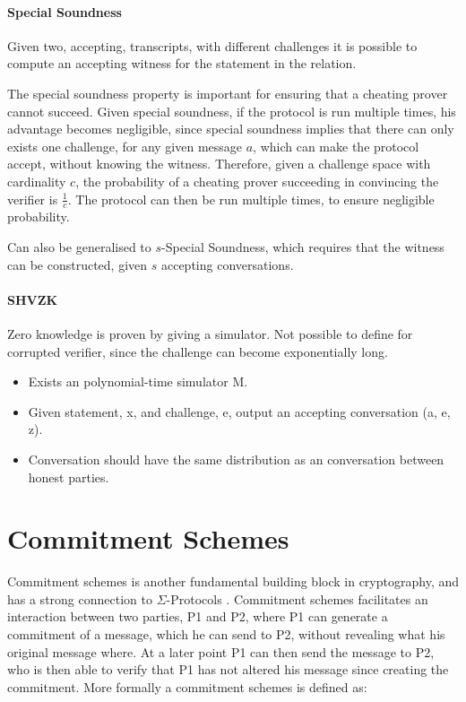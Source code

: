 \paragraph{Special Soundness}
Given two, accepting, transcripts, with different challenges it is possible to
compute an accepting witness for the statement in the relation.

The special soundness property is important for ensuring that a cheating prover
cannot succeed. Given special soundness, if the protocol is run multiple times,
his advantage becomes negligible, since special soundness implies that there can
only exists one challenge, for any given message $a$, which can make the
protocol accept, without knowing the witness. Therefore, given a challenge space
with cardinality $c$, the probability of a cheating prover succeeding in
convincing the verifier is $\frac{1}{c}$. The protocol can then be run multiple
times, to ensure negligible probability.

Can also be generalised to $s$-Special Soundness, which requires that the
witness can be constructed, given $s$ accepting conversations.

\paragraph{SHVZK}
Zero knowledge is proven by giving a simulator. Not possible to define for
corrupted verifier, since the challenge can become exponentially long.
\begin{itemize}
  \item Exists an polynomial-time simulator M.
  \item Given statement, x, and challenge, e, output an accepting
    conversation (a, e, z).
  \item Conversation should have the same distribution as an conversation
    between honest parties.
\end{itemize}




\section{Commitment Schemes}
\label{sec:commitment}
Commitment schemes is another fundamental building block in cryptography, and
has a strong connection to $\Sigma$-Protocols . Commitment
schemes facilitates an interaction between two parties, P1 and P2, where P1 can
generate a commitment of a message, which he can send to P2, without revealing
what his original message where. At a later point P1 can then send the message
to P2, who is then able to verify that P1 has not altered his message since
creating the commitment. More formally a commitment schemes is defined as:

